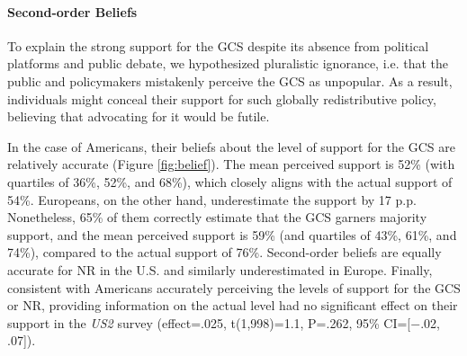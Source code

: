



\begin{tcolorbox}\label{subsec:second_order_beliefs}
  \paragraph{Second-order Beliefs}
To explain the strong support for the GCS despite its absence from political platforms and public debate, we hypothesized pluralistic ignorance, i.e. that the public and policymakers mistakenly perceive the GCS as unpopular. As a result, individuals might conceal their support for such globally redistributive policy, believing that advocating for it would be futile. 

In the case of Americans, their beliefs about the level of support for the GCS are relatively accurate (Figure \ref{fig:belief}). The mean perceived support is 52\% (with quartiles of 36\%, 52\%, and 68\%), which closely aligns with the actual support of 54\%. Europeans, on the other hand, underestimate the support by 17 p.p. Nonetheless, 65\% of them correctly estimate that the GCS garners majority support, and the mean perceived support is 59\% (and quartiles of 43\%, 61\%, and 74\%), compared to the actual support of 76\%. %
Second-order beliefs are equally accurate for NR in the U.S. and similarly underestimated in Europe. %
Finally, consistent with Americans accurately perceiving the levels of support for the GCS or NR, providing information on the actual level had no significant effect on their support in the \textit{US2} survey (effect=.025, t(1,998)=1.1, P=.262, 95\% CI=[$-$.02, .07]). %
\end{tcolorbox}

